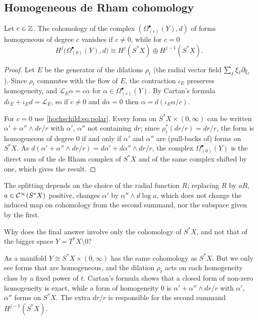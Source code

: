 \subsection{Homogeneous de Rham cohomology}
\begin{proposition}\label{hochschild:prop:homog-dR}
Let $c\in\mathbb{Z}$. The cohomology of the complex $(\Omega^\bullet_{(c)}(Y),d)$ of
forms homogeneous of degree $c$ vanishes if $c\ne0$, while for $c=0$
\begin{equation*}
  H^j\bigl(\Omega^\bullet_{(0)}(Y),d\bigr)\cong H^j(S^*X)\oplus H^{j-1}(S^*X).
\end{equation*}
\end{proposition}
\begin{proof}
Let $E$ be the generator of the dilations $\rho_t$ (the radial vector field
$\sum_j\xi_j\partial_{\xi_j}$). Since $\rho_t$ commutes with the flow of $E$, the
contraction $\iota_E$ preserves homogeneity, and $\mathcal L_E\alpha=c\alpha$
for $\alpha\in\Omega^\bullet_{(c)}(Y)$. By Cartan's formula
$d\iota_E+\iota_Ed=\mathcal L_E$, so if $c\ne0$ and $d\alpha=0$ then
$\alpha=d(\iota_E\alpha/c)$.

For $c=0$ use \eqref{hochschild:eq:polar}. Every form on $S^*X\times(0,\infty)$
can be written $\alpha'+\alpha''\wedge dr/r$ with $\alpha'$, $\alpha''$ not
containing $dr$; since $\rho_t^*(dr/r)=dr/r$, the form is homogeneous of
degree $0$ if and only if $\alpha'$ and $\alpha''$ are (pull-backs of) forms
on $S^*X$. As $d(\alpha'+\alpha''\wedge dr/r)=d\alpha'+d\alpha''\wedge dr/r$,
the complex $\Omega^\bullet_{(0)}(Y)$ is the direct sum of the de Rham complex
of $S^*X$ and of the same complex shifted by one, which gives the result.
\end{proof}

The splitting depends on the choice of the radial function $R$; replacing $R$
by $aR$, $a\in\mathcal{C}^\infty(S^*X)$ positive, changes $\alpha'$ by $\alpha''\wedge
d\log a$, which does not change the induced map on cohomology from the
second summand, nor the subspace given by the first.

\begin{question}
Why does the final answer involve only the cohomology of $S^*X$, and not
that of the bigger space $Y=T^*X\setminus0$?
\end{question}
\begin{answer}
As a manifold $Y\cong S^*X\times(0,\infty)$ has the same cohomology as
$S^*X$. But we only see forms that are homogeneous, and the dilation
$\rho_t$ acts on each homogeneity class by a fixed power of $t$. Cartan's
formula shows that a closed form of non-zero homogeneity is exact, while a
form of homogeneity $0$ is $\alpha'+\alpha''\wedge dr/r$ with $\alpha'$,
$\alpha''$ forms on $S^*X$. The extra $dr/r$ is responsible for the second
summand $H^{j-1}(S^*X)$.
\end{answer}

